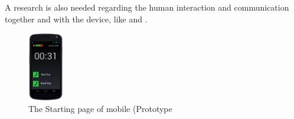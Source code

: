 \documentclass[conference]{IEEEtran}
\begin{document}
A research is also needed regarding the human interaction and communication
together and with the device, like \cite{behavior} and \cite{facial-vocal}.


\begin{figure}
 \centering
\includegraphics[width=0.14\textwidth]{kar}
\caption{The Starting page of mobile (Prototype}
\label{diagram}
\end{figure}




\end{document}
